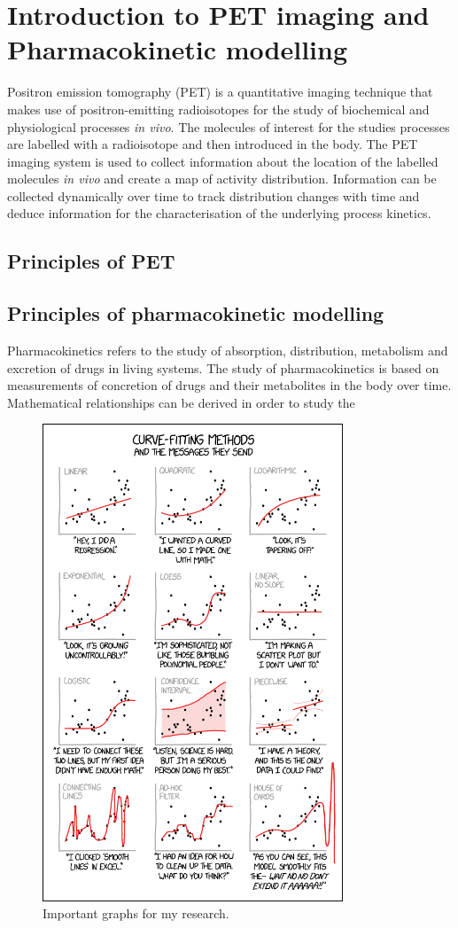 \chapter{Introduction to PET imaging and Pharmacokinetic modelling}

Positron emission tomography (PET) is a quantitative imaging technique that makes use of 
positron-emitting radioisotopes for the study of biochemical and physiological processes \textit{in vivo}. The molecules of interest for the studies processes are labelled with a radioisotope and then introduced in the body. The PET imaging system is used to collect information about the location of the labelled molecules \textit{in vivo} and create a map of activity distribution. Information can be collected dynamically over time to track distribution changes with time and deduce information for the characterisation of the underlying process kinetics. 
\section{Principles of PET}


\section{Principles of pharmacokinetic modelling }
Pharmacokinetics refers to the study of absorption, distribution, metabolism and excretion of drugs in living systems. The study of pharmacokinetics is based on measurements of concretion of drugs and their metabolites in the body over time. Mathematical relationships can be derived in order to study the 

\begin{figure}[ht]
	\includegraphics[width=0.8\textwidth]{figures/curve_fitting}
	\centering
	\caption{Important graphs for my research.}
	\centering
	\label{fig:curve_fitting}
\end{figure}